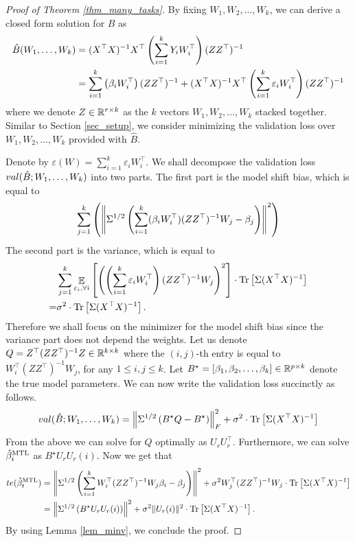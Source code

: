 \begin{proof}[Proof of Theorem \ref{thm_many_tasks}]
	By fixing $W_1, W_2, \dots, W_k$, we can derive a closed form solution for $B$ as
	\begin{align*}
		\hat{B}(W_1, \dots, W_k) &= (X^{\top}X)^{-1} X^{\top} \left({\sum_{i=1}^k Y_i W_i^{\top}}\right) (Z Z^{\top})^{-1} \\
		&= \sum_{i=1}^k \left({\beta_i W_i^{\top}}\right) (ZZ^{\top})^{-1} + (X^{\top}X)^{-1}X^{\top} \left({\sum_{i=1}^k \varepsilon_i W_i^{\top}}\right) (ZZ^{\top})^{-1}
	\end{align*}
	where we denote $Z\in\mathbb{R}^{r\times k}$ as the $k$ vectors $W_1, W_2, \dots, W_k$ stacked together.
	Similar to Section \ref{sec_setup}, we consider minimizing the validation loss over $W_1, W_2, \dots, W_k$ provided with $\hat{B}$.

	Denote by $\varepsilon(W) = \sum_{i=1}^k \varepsilon_i W_i^{\top}$.
	We shall decompose the validation loss $val(\hat{B}; W_1, \dots, W_k)$ into two parts.
	The first part is the model shift bias, which is equal to
	\begin{align*}
		\sum_{j=1}^k \left({\left\| \Sigma^{1/2}\left({\sum_{i=1}^k(\beta_i W_i^{\top}) (ZZ^{\top})^{-1} W_j - \beta_j}\right) \right\|^2}\right)
	\end{align*}
	The second part is the variance, which is equal to
	\begin{align*}
		& \sum_{j=1}^k \mathop{\mathbb{E}}_{\varepsilon_i, \forall i}\left[ \left({\left({\sum_{i=1}^k \varepsilon_i W_i^{\top}}\right) (ZZ^{\top})^{-1} W_j}\right)^2 \right] \cdot {\operatorname{Tr}\left[\Sigma(X^{\top}X)^{-1}\right]} \\
		=& \sigma^2 \cdot \operatorname{Tr}\left[\Sigma (X^{\top}X)^{-1}\right].
	\end{align*}
	Therefore we shall focus on the minimizer for the model shift bias since the variance part does not depend the weights.
	Let us denote $Q = Z^{\top} (ZZ^{\top})^{-1} Z \in\mathbb{R}^{k\times k}$ where the $(i,j)$-th entry is equal to $W_i^{\top} (ZZ^{\top})^{-1} W_j$, for any $1\le i, j\le k$.
	Let $B^{\star} = [\beta_1, \beta_2, \dots, \beta_k] \in\mathbb{R}^{p \times k}$ denote the true model parameters.
	We can now write the validation loss succinctly as follows.
	\begin{align*}
		val(\hat{B}; W_1, \dots, W_k) = \left\| \Sigma^{1/2} \left({B^{\star} Q - B^{\star}}\right) \right\|_{F}^2 + \sigma^2 \cdot \operatorname{Tr}\left[\Sigma (X^{\top}X)^{-1}\right]
	\end{align*}
	From the above we can solve for $Q$ optimally as $U_{r}U_r^{\top}$.
	Furthermore, we can solve $\hat{\beta}_i^{\text{MTL}}$ as $B^{\star} U_r U_r(i)$.
	Now we get that
	\begin{align*}
		te(\hat{\beta}_t^{\text{MTL}}) &= \left\| \Sigma^{1/2}\left({\sum_{i=1}^k W_i^{\top} (ZZ^{\top})^{-1}W_j \beta_i - \beta_j}\right) \right\|^2
		+ \sigma^2  W_j^{\top} (ZZ^{\top})^{-1} W_j \cdot \operatorname{Tr}\left[\Sigma (X^{\top}X)^{-1}\right] \\
		&= \left\| \Sigma^{1/2} \left({B^{\star} U_r U_r(i)}\right) \right\|^2 + \sigma^2\|U_r(i)\|^2 \cdot \operatorname{Tr}\left[\Sigma (X^{\top}X)^{-1}\right].
	\end{align*}
	By using Lemma \ref{lem_minv}, we conclude the proof.
\end{proof}
